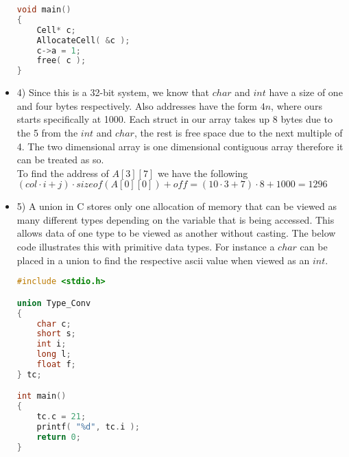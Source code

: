 \documentclass[ 12pt ]{article}
\begin{document}
\begin{itemize}
\begin{lstlisting}[language=C]
void main()
{
	Cell* c;
	AllocateCell( &c );
	c->a = 1;
	free( c );
}
	\end{lstlisting}

	\item[] {\large 4)}
	Since this is a 32-bit system, we know that $char$ and $int$ have a size of
	one and four bytes respectively. Also addresses have the form $4n$, where ours
	starts specifically at 1000. Each struct in our array takes up 8 bytes due
	to the 5 from the $int$ and $char$, the rest is free space due to the next
	multiple of 4. The two dimensional array is one dimensional contiguous array
	therefore it can be treated as so. \\
	To find the address of $A[3][7]$ we have the following \\
	$( col \cdot i + j ) \cdot sizeof( A[0][0] ) + off = ( 10 \cdot 3 + 7 ) \cdot 8 + 1000 = 1296$ \\

	\item[] {\large 5)}
	A union in C stores only one allocation of memory that can be viewed as many
	different types depending on the variable that is being accessed. This
	allows data of one type to be viewed as another without casting. The below
	code illustrates this with primitive data types. For instance a $char$ can be
	placed in a union to find the respective ascii value when viewed as an $int$.
	\begin{lstlisting}[language=C]
#include <stdio.h>

union Type_Conv
{
	char c;
	short s;
	int i;
	long l;
	float f;
} tc;

int main()
{
	tc.c = 21;
	printf( "%d", tc.i );
	return 0;
}
	\end{lstlisting}
\end{itemize}
\end{document}
